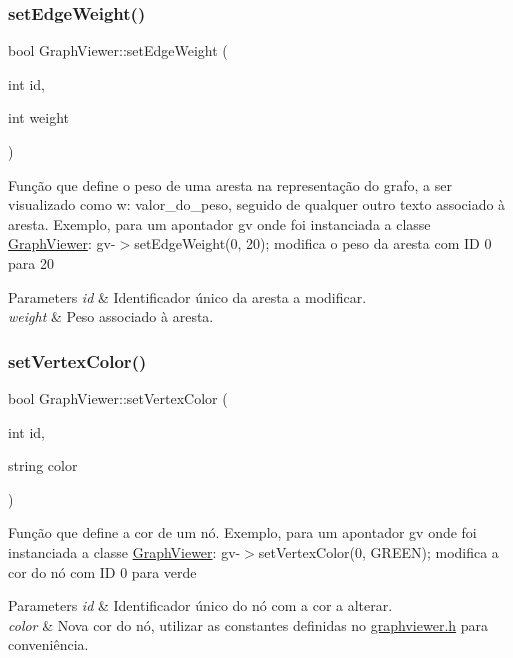 \subsubsection{\texorpdfstring{set\+Edge\+Weight()}{setEdgeWeight()}}
{\footnotesize\ttfamily bool Graph\+Viewer\+::set\+Edge\+Weight (\begin{DoxyParamCaption}\item[{int}]{id,  }\item[{int}]{weight }\end{DoxyParamCaption})}

Função que define o peso de uma aresta na representação do grafo, a ser visualizado como w\+: valor\+\_\+do\+\_\+peso, seguido de qualquer outro texto associado à aresta. Exemplo, para um apontador gv onde foi instanciada a classe \hyperlink{class_graph_viewer}{Graph\+Viewer}\+: gv-\/$>$set\+Edge\+Weight(0, 20); modifica o peso da aresta com ID 0 para 20


\begin{DoxyParams}{Parameters}
{\em id} & Identificador único da aresta a modificar. \\
\hline
{\em weight} & Peso associado à aresta. \\
\hline
\end{DoxyParams}
\hypertarget{class_graph_viewer_a8b542d7e09e81a45a74760c19233beb0}{}\label{class_graph_viewer_a8b542d7e09e81a45a74760c19233beb0} 
\subsubsection{\texorpdfstring{set\+Vertex\+Color()}{setVertexColor()}}
{\footnotesize\ttfamily bool Graph\+Viewer\+::set\+Vertex\+Color (\begin{DoxyParamCaption}\item[{int}]{id,  }\item[{string}]{color }\end{DoxyParamCaption})}

Função que define a cor de um nó. Exemplo, para um apontador gv onde foi instanciada a classe \hyperlink{class_graph_viewer}{Graph\+Viewer}\+: gv-\/$>$set\+Vertex\+Color(0, G\+R\+E\+E\+N); modifica a cor do nó com ID 0 para verde


\begin{DoxyParams}{Parameters}
{\em id} & Identificador único do nó com a cor a alterar. \\
\hline
{\em color} & Nova cor do nó, utilizar as constantes definidas no \hyperlink{graphviewer_8h_source}{graphviewer.\+h} para conveniência. \\
\hline
\end{DoxyParams}
\hypertarget{class_graph_viewer_a02d5f7393eab9a2d1b66719039597a64}{}\label{class_graph_viewer_a02d5f7393eab9a2d1b66719039597a64} 
